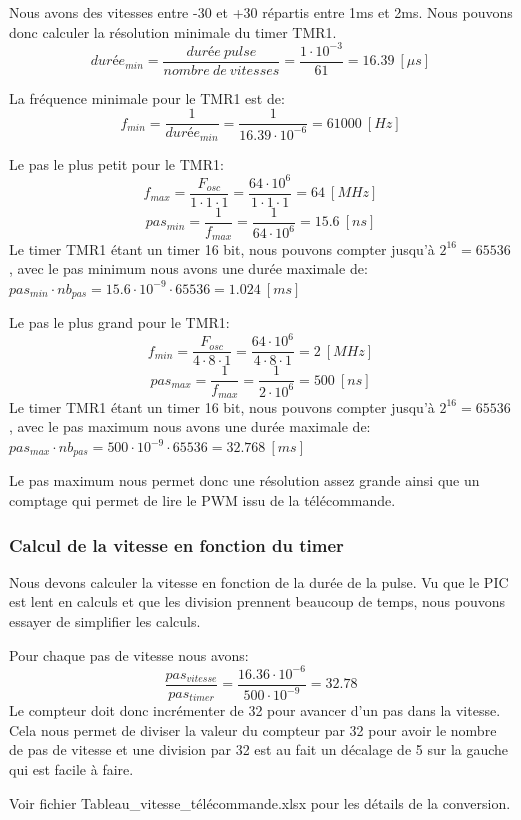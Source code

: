 \documentclass[fleqn, 11pt, a4paper]{article}
\begin{document}
  Nous avons des vitesses entre -30 et +30 répartis entre 1ms et 2ms.
  Nous pouvons donc calculer la résolution minimale du timer TMR1.
  $$durée_{min} = \frac{durée \ pulse}{nombre\ de\ vitesses} = \frac{1 \cdot 10^{-3}}{61} = 16.39 \ [\mu s]$$

  La fréquence minimale pour le TMR1 est de:
  $$f_{min} = \frac{1}{durée_{min}} = \frac{1}{16.39 \cdot 10^{-6}} = 61000\ [Hz]$$
  
  Le pas le plus petit pour le TMR1:
  $$f_{max} = \frac{F_{osc}}{1 \cdot 1 \cdot 1} = \frac{64 \cdot 10^{6}}{1 \cdot 1 \cdot 1} = 64\ [MHz]$$
  $$pas_{min} = \frac{1}{f_{max}}= \frac{1}{64 \cdot 10^{6}} = 15.6\ [ns]$$
  Le timer TMR1 étant un timer 16 bit, nous pouvons compter jusqu'à $2^{16} = 65536$, avec le pas minimum nous avons une durée maximale de: $pas_{min} \cdot nb_{pas} = 15.6 \cdot 10^{-9} \cdot 65536 = 1.024\ [ms]$
  
  Le pas le plus grand pour le TMR1:
    $$f_{min} = \frac{F_{osc}}{4 \cdot 8 \cdot 1} = \frac{64 \cdot 10^{6}}{4 \cdot 8 \cdot 1} = 2\ [MHz]$$
  $$pas_{max} = \frac{1}{f_{max}}= \frac{1}{2 \cdot 10^{6}} = 500\ [ns]$$
    Le timer TMR1 étant un timer 16 bit, nous pouvons compter jusqu'à $2^{16} = 65536$, avec le pas maximum nous avons une durée maximale de: $pas_{max} \cdot nb_{pas} = 500 \cdot 10^{-9} \cdot 65536 = 32.768\ [ms]$
    
    Le pas maximum nous permet donc une résolution assez grande ainsi que un comptage qui permet de lire le PWM issu de la télécommande.
    
    \subsubsection{Calcul de la vitesse en fonction du timer}
    Nous devons calculer la vitesse en fonction de la durée de la pulse.
    Vu que le PIC est lent en calculs et que les division prennent beaucoup de temps, nous pouvons essayer de simplifier les calculs.
    
    Pour chaque pas de vitesse nous avons:
    $$\frac{pas_{vitesse}}{pas_{timer}} =  \frac{16.36 \cdot 10^{-6}}{500 \cdot 10^{-9}}=32.78$$
    Le compteur doit donc incrémenter de 32 pour avancer d'un pas dans la vitesse. Cela nous permet de diviser la valeur du compteur par 32 pour avoir le nombre de pas de vitesse et une division par 32 est au fait un décalage de 5 sur la gauche qui est facile à faire.
    
    Voir fichier Tableau\_vitesse\_télécommande.xlsx pour les détails de la conversion.
    
\end{document}
